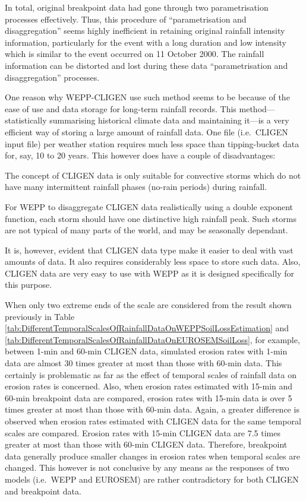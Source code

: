 In total, original breakpoint data had gone through two parametrisation
processes effectively. Thus, this procedure of ``parametrisation and
disaggregation'' seems highly inefficient in retaining original rainfall
intensity information, particularly for the event with a long duration and low
intensity which is similar to the event occurred on 11 October 2000. The
rainfall information can be distorted and lost during these data
``parametrisation and disaggregation'' processes.

One reason why WEPP-CLIGEN use such method seems to be because of the ease of
use and data storage for long-term rainfall records. This method---statistically
summarising historical climate data and maintaining it---is a very efficient way
of storing a large amount of rainfall data. One file (i.e.\ CLIGEN input file)
per weather station requires much less space than tipping-bucket data for, say,
10 to 20 years. This however does have a couple of disadvantages:
\begin{enumerate*}
  \item The concept of CLIGEN data is only suitable for convective storms which
do not have many intermittent rainfall phases (no-rain periods) during rainfall.
\medskip
  \item For WEPP to disaggregate CLIGEN data realistically using a double
exponent function, each storm should have one distinctive high rainfall peak.
Such storms are not typical of many parts of the world, and may be seasonally
dependant.
\end{enumerate*}
It is, however, evident that CLIGEN data type make it easier to deal with vast
amounts of data. It also requires considerably less space to store such data.
Also, CLIGEN data are very easy to use with WEPP as it is designed specifically
for this purpose.

When only two extreme ends of the scale are considered from the result shown
previously in Table
\ref{tab:DifferentTemporalScalesOfRainfallDataOnWEPPSoilLossEstimation} and
\ref{tab:DifferentTemporalScalesOfRainfallDataOnEUROSEMSoilLoss}, for example,
between 1-min and 60-min CLIGEN data, simulated erosion rates with 1-min data
are almost 30 times greater at most than those with 60-min data. This certainly
is problematic as far as the effect of temporal scales of rainfall data on
erosion rates is concerned. Also, when erosion rates estimated with 15-min and
60-min breakpoint data are compared, erosion rates with 15-min data is over 5
times greater at most than those with 60-min data. Again, a greater difference
is observed when erosion rates estimated with CLIGEN data for the same temporal
scales are compared. Erosion rates with 15-min CLIGEN data are 7.5 times greater
at most than those with 60-min CLIGEN data. Therefore, breakpoint data generally
produce smaller changes in erosion rates when temporal scales are changed. This
however is not conclusive by any means as the responses of two models (i.e.\
WEPP and EUROSEM) are rather contradictory for both CLIGEN and breakpoint data.

